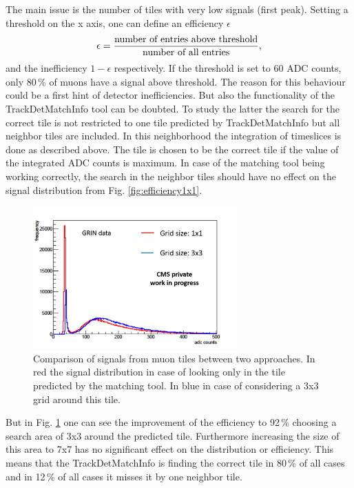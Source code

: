 			The main issue is the number of tiles with very low signals (first peak).
			Setting a threshold on the x axis, one can define an efficiency $\epsilon$
			\begin{equation}
				\epsilon = \frac{\textnormal{number of entries above threshold}}{\textnormal{number of all entries}},
			\end{equation}
			and the inefficiency $1-\epsilon$ respectively.
			If the threshold is set to 60 ADC counts, only 80\,\% of muons have a signal above threshold.
			The reason for this behaviour could be a first hint of detector inefficiencies.
			But also the functionality of the TrackDetMatchInfo tool can be doubted.
			To study the latter the search for the correct tile is not restricted to one tile predicted by TrackDetMatchInfo but all neighbor tiles are included.
			In this neighborhood the integration of timeslices is done as described above.
			The tile is chosen to be the correct tile if the value of the integrated ADC counts is maximum.
			In case of the matching tool being working correctly, the search in the neighbor tiles should have no effect on the signal distribution from Fig. \ref{fig:efficiency1x1}.
			\begin{figure}[htbp]
				\centering
				\includegraphics[width=0.70\textwidth]{Figures/erdogan/neighborhood.png}
				\caption{Comparison of signals from muon tiles between two approaches. In red the signal distribution in case of looking only in the tile predicted by the matching tool. In blue in case of
				considering a 3x3 grid around this tile.}
				\label{fig:neighborhood}
			\end{figure}
			But in Fig. \ref{fig:neighborhood} one can see the improvement of the efficiency to 92\,\% choosing a search area of 3x3 around the predicted tile.
			Furthermore increasing the size of this area to 7x7 has no significant effect on the distribution or efficiency.
			This means that the TrackDetMatchInfo is finding the correct tile in 80\,\% of all cases and in 12\,\% of all cases it misses it by one neighbor tile.
